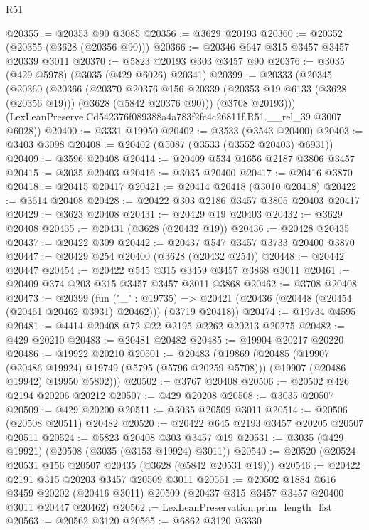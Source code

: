 \begin{lexlean}{R51}
\begin{coremodule}
@20355 := @20353 @90 @3085
@20356 := @3629 @20193
@20360 := @20352 (@20355 (@3628 (@20356 @90)))
@20366 := @20346 @647 @315 @3457 @3457 @20339 @3011
@20370 := @5823 @20193 @303 @3457 @90
@20376 := @3035 (@429 @5978) (@3035 (@429 @6026) @20341)
@20399 := @20333
    (@20345
      (@20360
        (@20366
          (@20370
            @20376
            @156
            @20339
            (@20353 @19 @6133 (@3628 (@20356 @19)))
            (@3628 (@5842 @20376 @90)))
          (@3708 @20193)))
      (LexLeanPreserve.Cd542376f089388a4a783f2fc4c26811f.R51.__rel_39 @3007 @6028))
@20400 := @3331 @19950
@20402 := @3533 (@3543 @20400)
@20403 := @3403 @3098
@20408 := @20402 (@5087 (@3533 (@3552 @20403) @6931))
@20409 := @3596 @20408
@20414 := @20409 @534 @1656 @2187 @3806 @3457
@20415 := @3035 @20403
@20416 := @3035 @20400
@20417 := @20416 @3870
@20418 := @20415 @20417
@20421 := @20414 @20418 (@3010 @20418)
@20422 := @3614 @20408
@20428 := @20422 @303 @2186 @3457 @3805 @20403 @20417
@20429 := @3623 @20408
@20431 := @20429 @19 @20403
@20432 := @3629 @20408
@20435 := @20431 (@3628 (@20432 @19))
@20436 := @20428 @20435
@20437 := @20422 @309
@20442 := @20437 @547 @3457 @3733 @20400 @3870
@20447 := @20429 @254 @20400 (@3628 (@20432 @254))
@20448 := @20442 @20447
@20454 := @20422 @545 @315 @3459 @3457 @3868 @3011
@20461 := @20409 @374 @203 @315 @3457 @3457 @3011 @3868
@20462 := @3708 @20408
@20473 := @20399
    (fun ("_" : @19735) =>
    @20421 (@20436 (@20448 (@20454 (@20461 @20462 @3931) @20462))) (@3719 @20418))
@20474 := @19734 @4595
@20481 := @4414 @20408 @72 @22 @2195 @2262 @20213 @20275
@20482 := @429 @20210
@20483 := @20481 @20482
@20485 := @19904 @20217 @20220
@20486 := @19922 @20210
@20501 := @20483
    (@19869
      (@20485
        (@19907 (@20486 @19924) @19749 (@5795 (@5796 @20259 @5708)))
        (@19907 (@20486 @19942) @19950 @5802)))
@20502 := @3767 @20408
@20506 := @20502 @426 @2194 @20206 @20212
@20507 := @429 @20208
@20508 := @3035 @20507
@20509 := @429 @20200
@20511 := @3035 @20509 @3011
@20514 := @20506 (@20508 @20511) @20482
@20520 := @20422 @645 @2193 @3457 @20205 @20507 @20511
@20524 := @5823 @20408 @303 @3457 @19
@20531 := @3035 (@429 @19921) (@20508 (@3035 (@3153 @19924) @3011))
@20540 := @20520 (@20524 @20531 @156 @20507 @20435 (@3628 (@5842 @20531 @19)))
@20546 := @20422 @2191 @315 @20203 @3457 @20509 @3011
@20561 := @20502
    @1884
    @616
    @3459
    @20202
    (@20416 @3011)
    @20509
    (@20437 @315 @3457 @3457 @20400 @3011 @20447 @20462)
@20562 := LexLeanPreservation.prim_length_list
@20563 := @20562 @3120
@20565 := @6862 @3120 @3330

\end{coremodule}
\end{lexlean}
